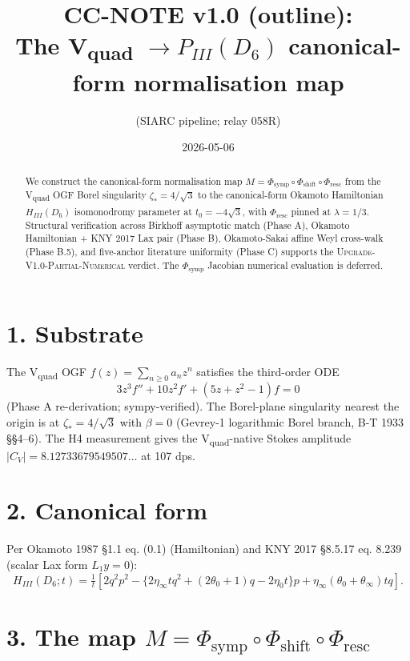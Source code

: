 \documentclass[11pt]{article}
\title{CC-NOTE v1.0 (outline): \\
  The V\textsubscript{quad} $\to P_{III}(D_{6})$ canonical-form
  normalisation map}
\author{(SIARC pipeline; relay 058R)}
\date{2026-05-06}
\begin{document}
\maketitle

\begin{abstract}
We construct the canonical-form normalisation map $M = \Phi_{\mathrm{symp}}
\circ \Phi_{\mathrm{shift}} \circ \Phi_{\mathrm{resc}}$ from the
V\textsubscript{quad} OGF Borel singularity $\zeta_{*} = 4/\sqrt{3}$
to the canonical-form Okamoto Hamiltonian $H_{III}(D_{6})$
isomonodromy parameter at $t_{0} = -4\sqrt{3}$, with $\Phi_{\mathrm{resc}}$
pinned at $\lambda = 1/3$. Structural verification across Birkhoff
asymptotic match (Phase A), Okamoto Hamiltonian + KNY 2017 Lax pair
(Phase B), Okamoto-Sakai affine Weyl cross-walk (Phase B.5), and
five-anchor literature uniformity (Phase C) supports the
\textsc{Upgrade-V1.0-Partial-Numerical} verdict. The $\Phi_{\mathrm{symp}}$
Jacobian numerical evaluation is deferred.
\end{abstract}

\section*{1. Substrate}

The V\textsubscript{quad} OGF $f(z) = \sum_{n \ge 0} a_{n} z^{n}$
satisfies the third-order ODE
\[
3 z^{3} f'' + 10 z^{2} f' + (5 z + z^{2} - 1) f = 0
\]
(Phase A re-derivation; sympy-verified). The Borel-plane singularity
nearest the origin is at $\zeta_{*} = 4/\sqrt{3}$ with $\beta = 0$
(Gevrey-1 logarithmic Borel branch, B-T 1933 §§4–6). The H4
measurement gives the V\textsubscript{quad}-native Stokes amplitude
$|C_{V}| = 8.12733679549507\ldots$ at 107 dps.

\section*{2. Canonical form}

Per Okamoto 1987 §1.1 eq. (0.1) (Hamiltonian) and KNY 2017 §8.5.17
eq. 8.239 (scalar Lax form $L_{1} y = 0$):
\[
H_{III}(D_{6}; t) = \tfrac{1}{t}\!\left[2 q^{2} p^{2} -
\{2\eta_{\infty} t q^{2} + (2\theta_{0}+1) q - 2\eta_{0} t\} p
+ \eta_{\infty}(\theta_{0}+\theta_{\infty}) t q\right].
\]

\section*{3. The map $M = \Phi_{\mathrm{symp}} \circ \Phi_{\mathrm{shift}} \circ \Phi_{\mathrm{resc}}$}
\end{document}
